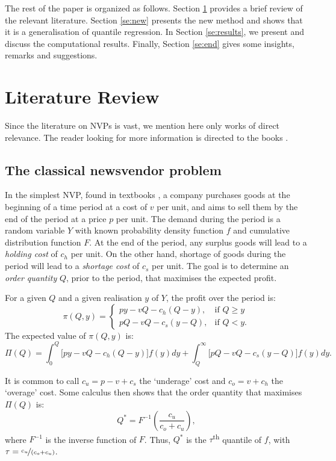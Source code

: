 \documentclass{article}
\begin{document}
The rest of the paper is organized as follows. Section \ref{se:lit} provides a brief review of the relevant literature. Section \ref{se:new} presents the new method and shows that it is a generalisation of quantile regression. In Section \ref{se:results}, we present and discuss the computational results. Finally, Section \ref{se:end} gives some insights, remarks and suggestions.

\section{Literature Review} \label{se:lit}

Since the literature on NVPs is vast, we mention here only works of direct relevance. The reader looking for more information is directed to the books \cite{Ch12,Po02,SPP98,Zi00}.

\subsection{The classical newsvendor problem} %

In the simplest NVP, found in textbooks \cite{Ch12}, a company purchases goods at the beginning of a time period at a cost of $v$ per unit, and aims to sell them by the end of the period at a price $p$ per unit. The demand during the period is a random variable $Y$ with known probability density function $f$ and cumulative distribution function $F$. At the end of the period, any surplus goods will lead to a \emph{holding cost} of $c_h$ per unit. On the other hand, shortage of goods during the period will lead to a \emph{shortage cost} of $c_s$ per unit. The goal is to determine an \emph{order quantity} $Q$, prior to the period, that maximises the expected profit.

For a given $Q$ and a given realisation $y$ of $Y$, the profit over the period is:
\[
    \pi(Q,y)=
    \begin{cases}
        py-vQ-c_h(Q-y),& \text{if } Q\geq y\\
        pQ-vQ-c_s(y-Q),& \text{if } Q< y.
    \end{cases}
\]
The expected value of $\pi(Q,y)$ is:
\[
    \Pi(Q) = \int_{0}^{Q} \big[ py-vQ-c_h(Q-y) \big] f(y)dy + \int_{Q}^{\infty} \big[ pQ-vQ-c_s(y-Q) \big] f(y)dy.
\]

It is common to call $c_u= p-v+c_s$ the ‘underage’ cost and $c_o = v+c_h$ the ‘overage’ cost. Some calculus then shows that the order quantity that maximises $\Pi(Q)$ is:
\[
    Q^* = F^{-1}\left( \frac{c_u}{c_o+c_u} \right),
\]
where $F^{-1}$ is the inverse function of $F$. Thus, $Q^*$ is the $\tau$\textsuperscript{th} quantile of $f$, with $\tau=\nicefrac{c_u}{(c_o+c_u)}$.
\end{document}
